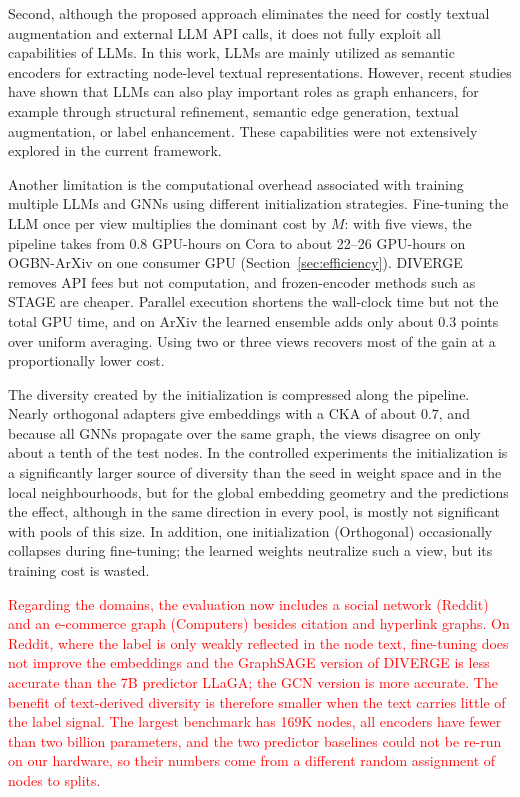\documentclass[a4paper,fleqn]{cas-sc}
\newcommand{\revone}[1]{\textcolor{red}{#1}}   %
\DeclareRobustCommand{\revcommon}[2][]{\textcolor{revshared}{#2}} %
\begin{document}
Second, although the proposed approach eliminates the need for costly textual augmentation and external LLM API calls, it does not fully exploit all capabilities of LLMs. In this work, LLMs are mainly utilized as semantic encoders for extracting node-level textual representations. However, recent studies have shown that LLMs can also play important roles as graph enhancers, for example through structural refinement, semantic edge generation, textual augmentation, or label enhancement. These capabilities were not extensively explored in the current framework.

Another limitation is the computational overhead associated with training multiple LLMs and GNNs using different initialization strategies. \revcommon[R1,R2,R4]{Fine-tuning the LLM once per view multiplies the dominant cost by $M$: with five views, the pipeline takes from 0.8 GPU-hours on Cora to about 22--26 GPU-hours on OGBN-ArXiv on one consumer GPU (Section~\ref{sec:efficiency}). DIVERGE removes API fees but not computation, and frozen-encoder methods such as STAGE are cheaper. Parallel execution shortens the wall-clock time but not the total GPU time, and on ArXiv the learned ensemble adds only about 0.3 points over uniform averaging. Using two or three views recovers most of the gain at a proportionally lower cost.}

\revcommon[R1,R2,R4]{The diversity created by the initialization is compressed along the pipeline. Nearly orthogonal adapters give embeddings with a CKA of about $0.7$, and because all GNNs propagate over the same graph, the views disagree on only about a tenth of the test nodes. In the controlled experiments the initialization is a significantly larger source of diversity than the seed in weight space and in the local neighbourhoods, but for the global embedding geometry and the predictions the effect, although in the same direction in every pool, is mostly not significant with pools of this size. In addition, one initialization (Orthogonal) occasionally collapses during fine-tuning; the learned weights neutralize such a view, but its training cost is wasted.}

\revone{Regarding the domains, the evaluation now includes a social network (Reddit) and an e-commerce graph (Computers) besides citation and hyperlink graphs. On Reddit, where the label is only weakly reflected in the node text, fine-tuning does not improve the embeddings and the GraphSAGE version of DIVERGE is less accurate than the 7B predictor LLaGA; the GCN version is more accurate. The benefit of text-derived diversity is therefore smaller when the text carries little of the label signal. The largest benchmark has 169K nodes, all encoders have fewer than two billion parameters, and the two predictor baselines could not be re-run on our hardware, so their numbers come from a different random assignment of nodes to splits.}
\end{document}

